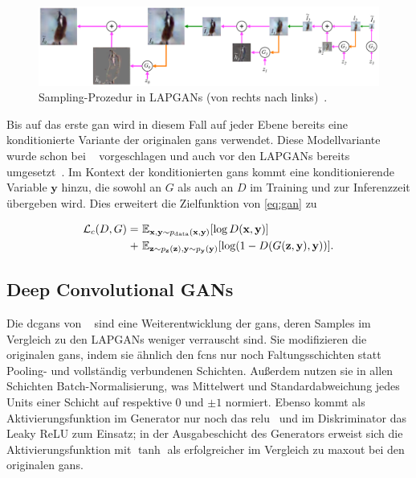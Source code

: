 \begin{figure}
	\centering
	\includegraphics[width=0.9\linewidth]{img/lapgan_sampling}
	\caption{Sampling-Prozedur in LAPGANs (von rechts nach links)~\cite{Denton.2015}.}
	\label{fig:lapgansampling}
\end{figure}

Bis auf das erste \gls{gan} wird in diesem Fall auf jeder Ebene bereits eine konditionierte Variante der originalen \glspl{gan} verwendet.
Diese Modellvariante wurde schon bei \citeauthor{Goodfellow.2014}~\cite{Goodfellow.2014} vorgeschlagen und auch vor den LAPGANs bereits umgesetzt~\cite{Gauthier.2014,Mirza.2014}.
Im Kontext der konditionierten \glspl{gan} kommt eine konditionierende Variable $ \mathbf{y} $ hinzu, die sowohl an $ G $ als auch an $ D $ im Training und zur Inferenzzeit übergeben wird.
Dies erweitert die Zielfunktion von \autoref{eq:gan} zu

\begin{equation}
\begin{split}
\mathcal{L}_c(D, G) = & \ \mathbb{E}_{\mathbf{x}, \mathbf{y} \sim p_{\textup{data}}(\mathbf{x}, \mathbf{y})} [\log D(\mathbf{x}, \mathbf{y})] \\
+ & \ \mathbb{E}_{\mathbf{z} \sim p_{\mathbf{z}}(\mathbf{z}), \mathbf{y} \sim p_{\mathbf{y}}(\mathbf{y})} [\log(1 - D(G(\mathbf{z}, \mathbf{y}), \mathbf{y}))].
\end{split}
\end{equation}



\subsection{Deep Convolutional GANs}

Die \glspl{dcgan} von \citeauthor{Radford.2016}~\cite{Radford.2016} sind eine Weiterentwicklung der \glspl{gan}, deren Samples im Vergleich zu den LAPGANs weniger verrauscht sind.
Sie modifizieren die originalen \glspl{gan}, indem sie ähnlich den \glspl{fcn} nur noch Faltungsschichten statt Pooling- und vollständig verbundenen Schichten.
Außerdem nutzen sie in allen Schichten Batch-Normalisierung, was Mittelwert und Standardabweichung jedes Units einer Schicht auf respektive 0 und $ \pm 1 $ normiert.
Ebenso kommt als Aktivierungsfunktion im Generator nur noch das \gls{relu}~\cite{Nair.2010} und im Diskriminator das Leaky ReLU zum Einsatz; in der Ausgabeschicht des Generators erweist sich die Aktivierungsfunktion mit $ \tanh $ als erfolgreicher im Vergleich zu maxout bei den originalen \glspl{gan}.

